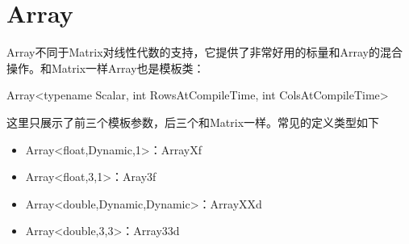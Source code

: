 \section{Array}
Array不同于Matrix对线性代数的支持，它提供了非常好用的标量和Array的混合操作。和Matrix一样Array也是模板类：
\begin{cpp}
Array<typename Scalar, int RowsAtCompileTime, int ColsAtCompileTime>
\end{cpp}
这里只展示了前三个模板参数，后三个和Matrix一样。常见的定义类型如下
\begin{itemize}
\item Array<float,Dynamic,1>：ArrayXf
\item Array<float,3,1>：Aray3f
\item Array<double,Dynamic,Dynamic>：ArrayXXd
\item Array<double,3,3>：Array33d
\end{itemize}


